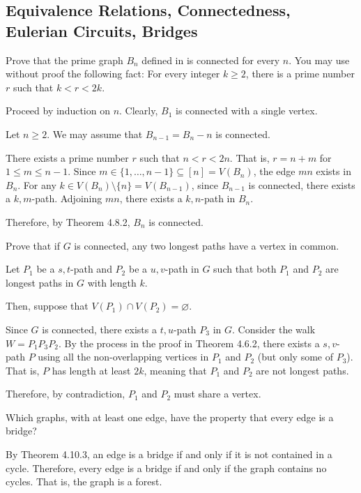 \setcounter{subsection}{9}
\subsection{Equivalence Relations, Connectedness, Eulerian Circuits, Bridges}

\begin{xca}
  Prove that the prime graph $B_n$ defined in  is connected for every $n$.
  You may use without proof the following fact:
  For every integer $k \geq 2$,
  there is a prime number $r$ such that $k < r < 2k$.
\end{xca}
\begin{prf}
  Proceed by induction on $n$.
  Clearly, $B_1$ is connected with a single vertex.

  Let $n \geq 2$. We may assume that $B_{n-1} = B_n - n$ is connected.

  There exists a prime number $r$ such that $n < r < 2n$.
  That is, $r = n + m$ for $1 \leq m \leq n-1$.
  Since $m \in \{1,\dotsc,n-1\} \subseteq [n] = V(B_n)$,
  the edge $mn$ exists in $B_n$.
  For any $k \in V(B_n) \setminus \{n\} = V(B_{n-1})$,
  since $B_{n-1}$ is connected, there exists a $k,m$-path.
  Adjoining $mn$, there exists a $k,n$-path in $B_n$.

  Therefore, by Theorem 4.8.2, $B_n$ is connected.
\end{prf}

\begin{xca}
  Prove that if $G$ is connected,
  any two longest paths have a vertex in common.
\end{xca}
\begin{prf}
  Let $P_1$ be a $s,t$-path and $P_2$ be a $u,v$-path in $G$
  such that both $P_1$ and $P_2$ are longest paths in $G$ with length $k$.

  Then, suppose that $V(P_1) \cap V(P_2) = \varnothing$.

  Since $G$ is connected, there exists a $t,u$-path $P_3$ in $G$.
  Consider the walk $W = P_1P_3P_2$.
  By the process in the proof in Theorem 4.6.2,
  there exists a $s,v$-path $P$ using all the non-overlapping
  vertices in $P_1$ and $P_2$ (but only some of $P_3$).
  That is, $P$ has length at least $2k$, meaning that $P_1$ and $P_2$ are not longest paths.

  Therefore, by contradiction, $P_1$ and $P_2$ must share a vertex.
\end{prf}

\begin{xca}
  Which graphs, with at least one edge,
  have the property that every edge is a bridge?
\end{xca}
\begin{sol}
  By Theorem 4.10.3, an edge is a bridge if and only if it is not contained in a cycle.
  Therefore, every edge is a bridge if and only if the graph contains no cycles.
  That is, the graph is a forest.
\end{sol}

